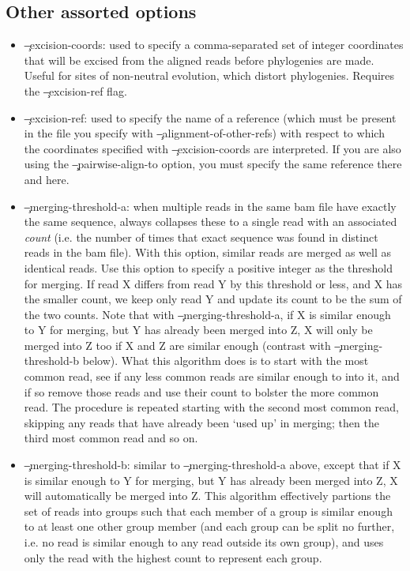 \subsection{Other assorted options}
\begin{itemize}
\item \c{--excision-coords}: used to specify a comma-separated set of integer coordinates that will be excised from the aligned reads before phylogenies are made.
Useful for sites of non-neutral evolution, which distort phylogenies.
Requires the \c{--excision-ref} flag.
\item \c{--excision-ref}: used to specify the name of a reference (which must be present in the file you specify with \c{--alignment-of-other-refs}) with respect to which the coordinates specified with \c{--excision-coords} are interpreted.
If you are also using the \c{--pairwise-align-to} option, you must specify the same reference there
and here.
\item \c{--merging-threshold-a}: when multiple reads in the same bam file have exactly the same sequence, \pmt always collapses these to a single read with an associated {\it count} (i.e. the number of times that exact sequence was found in distinct reads in the bam file).
With this option, similar reads are merged as well as identical reads.
Use this option to specify a positive integer as the threshold for merging.
If read X differs from read Y by this threshold or less, and X has the smaller count, we keep only read Y and update its count to be the sum of the two counts.
Note that with \c{--merging-threshold-a}, if X is similar enough to Y for merging, but Y has already been merged into Z, X will only be merged into Z too if X and Z are similar enough (contrast with \c{--merging-threshold-b} below).
What this algorithm does is to start with the most common read, see if any less common reads are similar enough to into it, and if so remove those reads and use their count to bolster the more common read.
The procedure is repeated starting with the second most common read, skipping any reads that have already been `used up'  in merging; then the third most common read and so on.
\item \c{--merging-threshold-b}: similar to \c{--merging-threshold-a} above, except that if X is similar enough to Y for merging, but Y has already been merged into Z, X will automatically be merged into Z.
This algorithm effectively partions the set of reads into groups such that each member of a group is similar enough to at least one other group member (and each group can be split no further, i.e. no read is similar enough to any read outside its own group), and uses only the read with the highest count to represent each group.

\end{itemize}
